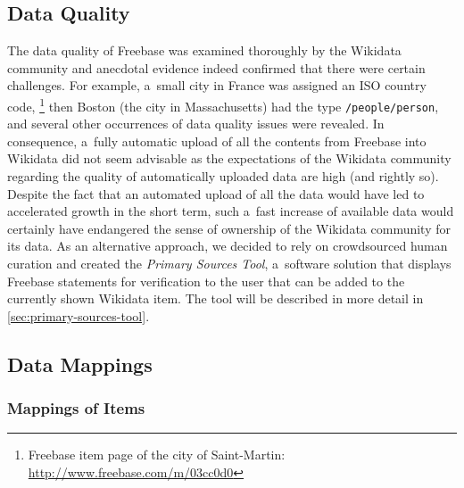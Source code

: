\documentclass{sig-alternate}
\begin{document}
\subsection{Data Quality}

The data quality of Freebase was examined thoroughly by the Wikidata community
and anecdotal evidence indeed confirmed that there were certain challenges.
For example, a~small city in France was assigned an ISO country code,%
\footnote{Freebase item page of the city of Saint-Martin: \url{http://www.freebase.com/m/03cc0d0}}
then Boston (the city in Massachusetts) had the type \texttt{/people/person},
and several other occurrences of data quality issues were revealed.
In consequence, a~fully automatic upload of all the contents from Freebase into Wikidata
did not seem advisable as the expectations of the Wikidata community regarding the
quality of automatically uploaded data are high (and rightly so).
Despite the fact that an automated upload of all the data
would have led to accelerated growth in the short term,
such a~fast increase of available data would certainly have endangered
the sense of ownership of the Wikidata community for its data.
As an alternative approach, we decided to rely on crowdsourced human curation
and created the \emph{Primary Sources Tool},
a~software solution that displays Freebase statements
for verification to the user that can be added to the currently shown Wikidata item.
The tool will be described in more detail in \autoref{sec:primary-sources-tool}.

\subsection{Data Mappings}

\subsubsection{Mappings of Items}
\end{document}
